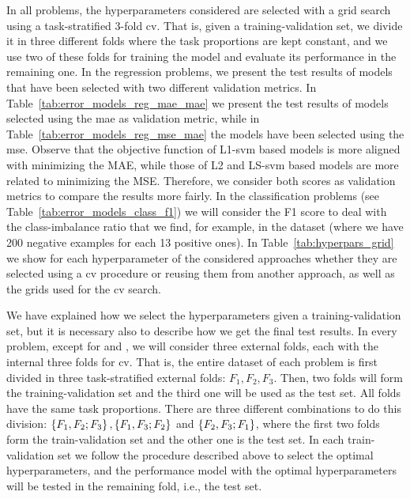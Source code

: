 In all problems, the hyperparameters considered are selected with a grid search using a task-stratified $3$-fold \acrshort{cv}. That is, given a training-validation set, we divide it in three different folds where the task proportions are kept constant, and we use two of these folds for training the model and evaluate its performance in the remaining one.
%
In the regression problems, we present the test results of models that have been selected with two different validation metrics. In Table~\ref{tab:error_models_reg_mae_mae} we present the test results of models selected using the \acrshort{mae} as validation metric, while in Table~\ref{tab:error_models_reg_mse_mae} the models have been selected using the \acrshort{mse}.
%
Observe that the objective function of L1-\acrshort{svm} based models is more aligned with minimizing the MAE, while those of L2 and LS-\acrshort{svm} based models are more related to minimizing the MSE. Therefore, we consider both scores as validation metrics to compare the results more fairly.
%
In the classification problems (see Table~\ref{tab:error_models_class_f1}) we will consider the F1 score to deal with the class-imbalance ratio that we find, for example, in the  dataset (where we have 200 negative examples for each 13 positive ones).
%
In Table~\ref{tab:hyperpars_grid} we show for each hyperparameter of the considered approaches whether they are selected using a \acrshort{cv} procedure or reusing them from another approach, as well as the grids used for the \acrshort{cv} search.

We have explained how we select the hyperparameters given a training-validation set, but it is necessary also to describe how we get the final test results.
In every problem, except for  and , we will consider three external folds, each with the internal three folds for \acrshort{cv}. That is, the entire dataset of each problem is first divided in three task-stratified external folds: $F_1, F_2, F_3$. Then, two folds will form the training-validation set and the third one will be used as the test set. All folds have the same task proportions. There are three different combinations to do this division: $\left\{F_1, F_2; F_3\right\}, \left\{F_1, F_3; F_2\right\}$ and $\left\{F_2, F_3; F_1\right\}$, where the first two folds form the train-validation set and the other one is the test set.
%
In each train-validation set we follow the procedure described above to select the optimal hyperparameters, and the performance model with the optimal hyperparameters will be tested in the remaining fold, i.e., the test set.
%

